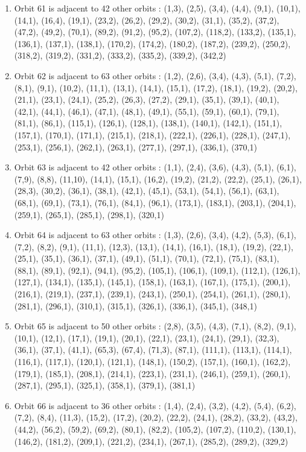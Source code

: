 \documentclass[12pt]{article}
\begin{document}
\begin{enumerate}
\item Orbit 61 is adjacent to 42 other orbits : (1,3), (2,5), (3,4), (4,4), (9,1), (10,1), (14,1), (16,4), (19,1), (23,2), (26,2), (29,2), (30,2), (31,1), (35,2), (37,2), (47,2), (49,2), (70,1), (89,2), (91,2), (95,2), (107,2), (118,2), (133,2), (135,1), (136,1), (137,1), (138,1), (170,2), (174,2), (180,2), (187,2), (239,2), (250,2), (318,2), (319,2), (331,2), (333,2), (335,2), (339,2), (342,2)
\item Orbit 62 is adjacent to 63 other orbits : (1,2), (2,6), (3,4), (4,3), (5,1), (7,2), (8,1), (9,1), (10,2), (11,1), (13,1), (14,1), (15,1), (17,2), (18,1), (19,2), (20,2), (21,1), (23,1), (24,1), (25,2), (26,3), (27,2), (29,1), (35,1), (39,1), (40,1), (42,1), (44,1), (46,1), (47,1), (48,1), (49,1), (55,1), (59,1), (60,1), (79,1), (81,1), (86,1), (115,1), (126,1), (128,1), (138,1), (140,1), (142,1), (151,1), (157,1), (170,1), (171,1), (215,1), (218,1), (222,1), (226,1), (228,1), (247,1), (253,1), (256,1), (262,1), (263,1), (277,1), (297,1), (336,1), (370,1)
\item Orbit 63 is adjacent to 42 other orbits : (1,1), (2,4), (3,6), (4,3), (5,1), (6,1), (7,9), (8,8), (11,10), (14,1), (15,1), (16,2), (19,2), (21,2), (22,2), (25,1), (26,1), (28,3), (30,2), (36,1), (38,1), (42,1), (45,1), (53,1), (54,1), (56,1), (63,1), (68,1), (69,1), (73,1), (76,1), (84,1), (96,1), (173,1), (183,1), (203,1), (204,1), (259,1), (265,1), (285,1), (298,1), (320,1)
\item Orbit 64 is adjacent to 63 other orbits : (1,3), (2,6), (3,4), (4,2), (5,3), (6,1), (7,2), (8,2), (9,1), (11,1), (12,3), (13,1), (14,1), (16,1), (18,1), (19,2), (22,1), (25,1), (35,1), (36,1), (37,1), (49,1), (51,1), (70,1), (72,1), (75,1), (83,1), (88,1), (89,1), (92,1), (94,1), (95,2), (105,1), (106,1), (109,1), (112,1), (126,1), (127,1), (134,1), (135,1), (145,1), (158,1), (163,1), (167,1), (175,1), (200,1), (216,1), (219,1), (237,1), (239,1), (243,1), (250,1), (254,1), (261,1), (280,1), (281,1), (296,1), (310,1), (315,1), (326,1), (336,1), (345,1), (348,1)
\item Orbit 65 is adjacent to 50 other orbits : (2,8), (3,5), (4,3), (7,1), (8,2), (9,1), (10,1), (12,1), (17,1), (19,1), (20,1), (22,1), (23,1), (24,1), (29,1), (32,3), (36,1), (37,1), (41,1), (65,3), (67,4), (71,3), (87,1), (111,1), (113,1), (114,1), (116,1), (117,1), (120,1), (121,1), (148,1), (150,2), (157,1), (160,1), (162,2), (179,1), (185,1), (208,1), (214,1), (223,1), (231,1), (246,1), (259,1), (260,1), (287,1), (295,1), (325,1), (358,1), (379,1), (381,1)
\item Orbit 66 is adjacent to 36 other orbits : (1,4), (2,4), (3,2), (4,2), (5,4), (6,2), (7,2), (8,4), (11,3), (15,2), (17,2), (20,2), (22,2), (24,1), (28,2), (33,2), (43,2), (44,2), (56,2), (59,2), (69,2), (80,1), (82,2), (105,2), (107,2), (110,2), (130,1), (146,2), (181,2), (209,1), (221,2), (234,1), (267,1), (285,2), (289,2), (329,2)

\end{enumerate}
\end{document}

